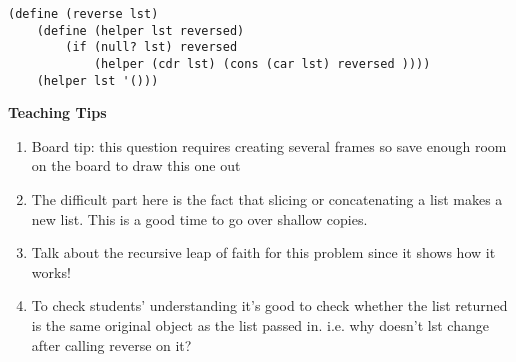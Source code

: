 \begin{parts}
\begin{blocksection}
\begin{solution}%
\begin{lstlisting}
(define (reverse lst)
    (define (helper lst reversed)
        (if (null? lst) reversed
            (helper (cdr lst) (cons (car lst) reversed ))))
    (helper lst '()))
\end{lstlisting}
\end{solution}
\end{blocksection}
\end{parts}
\begin{blocksection}
	\begin{guide}
	\textbf{Teaching Tips}
	\begin{enumerate}
			\item Board tip: this question requires creating several frames so save enough room on the board to draw this one out 
            \item The difficult part here is the fact that slicing or concatenating a list makes a new list. This is a good time to go over shallow copies.
            \item Talk about the recursive leap of faith for this problem since it shows how it works!
            \item To check students’ understanding it’s good to check whether the list returned is the same original object as the list passed in. i.e. why doesn’t lst change after calling reverse on it?
	\end{enumerate}
	\end{guide}
\end{blocksection}